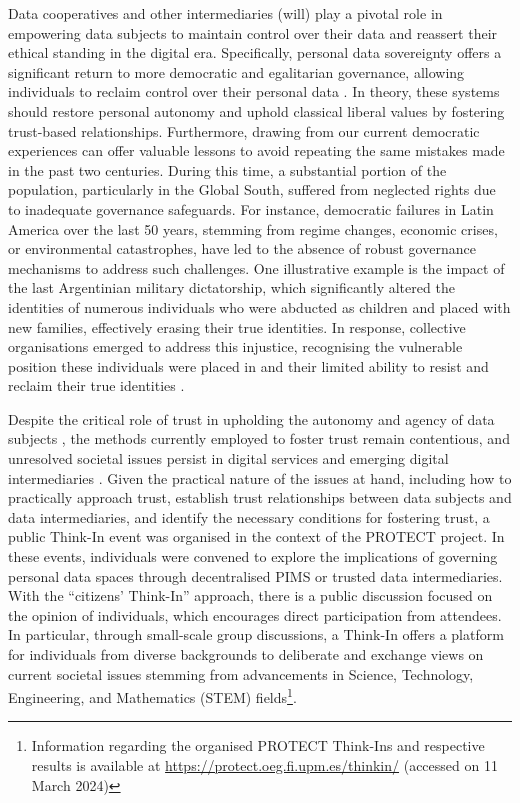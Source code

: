 Data cooperatives and other intermediaries (will) play a pivotal role in empowering data subjects to maintain control over their data and reassert their ethical standing in the digital era.
Specifically, personal data sovereignty offers a significant return to more democratic and egalitarian governance, allowing individuals to reclaim control over their personal data \citep{craglia_digitranscope_2021, giannopoulou_digital_2023}.
In theory, these systems should restore personal autonomy and uphold classical liberal values by fostering trust-based relationships. %
Furthermore, drawing from our current democratic experiences can offer valuable lessons to avoid repeating the same mistakes made in the past two centuries.
During this time, a substantial portion of the population, particularly in the Global South, suffered from neglected rights due to inadequate governance safeguards. %
For instance, democratic failures in Latin America over the last 50 years, stemming from regime changes, economic crises, or environmental catastrophes, have led to the absence of robust governance mechanisms to address such challenges.
One illustrative example is the impact of the last Argentinian military dictatorship, which significantly altered the identities of numerous individuals who were abducted as children and placed with new families, effectively erasing their true identities.
In response, collective organisations emerged to address this injustice, recognising the vulnerable position these individuals were placed in and their limited ability to resist and reclaim their true identities \citep{gesteira_mas_2014}.

Despite the critical role of trust in upholding the autonomy and agency of data subjects \citep{benshahar_more_2014}, the methods currently employed to foster trust remain contentious, and unresolved societal issues persist in digital services and emerging digital intermediaries \citep{carovano_regulating_2023}.
Given the practical nature of the issues at hand, including how to practically approach trust, establish trust relationships between data subjects and data intermediaries, and identify the necessary conditions for fostering trust, a public Think-In event was organised in the context of the PROTECT project.
In these events, individuals were convened to explore the implications of governing personal data spaces through decentralised PIMS or trusted data intermediaries.
With the ``citizens' Think-In'' approach, there is a public discussion focused on the opinion of individuals, which encourages direct participation from attendees.
In particular, through small-scale group discussions, a Think-In offers a platform for individuals from diverse backgrounds to deliberate and exchange views on current societal issues stemming from advancements in Science, Technology, Engineering, and Mathematics (STEM) fields\footnote{Information regarding the organised PROTECT Think-Ins and respective results is available at \url{https://protect.oeg.fi.upm.es/thinkin/} (accessed on 11 March 2024)}. %

